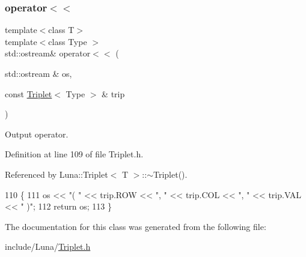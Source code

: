 \subsubsection{\texorpdfstring{operator$<$$<$}{operator<<}}
{\footnotesize\ttfamily template$<$class T$>$ \\
template$<$class Type $>$ \\
std\+::ostream\& operator$<$$<$ (\begin{DoxyParamCaption}\item[{std\+::ostream \&}]{os,  }\item[{const \hyperlink{classLuna_1_1Triplet}{Triplet}$<$ Type $>$ \&}]{trip }\end{DoxyParamCaption})\hspace{0.3cm}{\ttfamily [friend]}}



Output operator. 



Definition at line 109 of file Triplet.\+h.



Referenced by Luna\+::\+Triplet$<$ T $>$\+::$\sim$\+Triplet().


\begin{DoxyCode}
110   \{
111         os << \textcolor{stringliteral}{"( "} << trip.ROW << \textcolor{stringliteral}{", "} << trip.COL << \textcolor{stringliteral}{", "} << trip.VAL << \textcolor{stringliteral}{" )"};
112     \textcolor{keywordflow}{return} os;
113   \}
\end{DoxyCode}


The documentation for this class was generated from the following file\+:\begin{DoxyCompactItemize}
\item 
include/\+Luna/\hyperlink{Triplet_8h}{Triplet.\+h}\end{DoxyCompactItemize}
